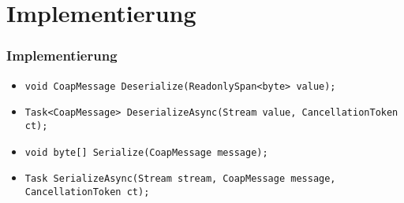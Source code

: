\documentclass[11pt,t,usepdftitle=false,aspectratio=169,usenames,dvipsnames]{beamer}
\begin{document}
    \section{Implementierung}
    \begin{frame}
        \frametitle{Implementierung}

        \begin{itemize}
            \item<1-> \texttt{void CoapMessage Deserialize(ReadonlySpan<byte> value);}
            \item<2-> \texttt{Task<CoapMessage> DeserializeAsync(Stream value, CancellationToken ct);}
            \item<3-> \texttt{void byte[] Serialize(CoapMessage message);}
            \item<4-> \texttt{Task SerializeAsync(Stream stream, CoapMessage message, CancellationToken ct);}
        \end{itemize}
    \end{frame}
\end{document}
